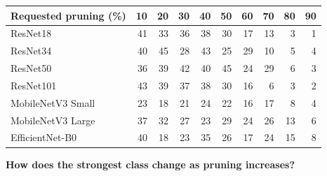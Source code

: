 \begin{center}\small\setlength{\tabcolsep}{4.2pt}
\begin{tabular}{@{}lrrrrrrrrr@{}}\toprule
Requested pruning (\%) & 10 & 20 & 30 & 40 & 50 & 60 & 70 & 80 & 90 \\ \midrule
ResNet18 & \cellcolor{teal!26}41 & \cellcolor{teal!21}33 & \cellcolor{teal!23}36 & \cellcolor{teal!24}38 & \cellcolor{teal!19}30 & \cellcolor{teal!11}17 & \cellcolor{teal!8}13 & \cellcolor{teal!1}3 & \cellcolor{teal!0}1 \\
ResNet34 & \cellcolor{teal!26}40 & \cellcolor{teal!29}45 & \cellcolor{teal!18}28 & \cellcolor{teal!27}43 & \cellcolor{teal!16}25 & \cellcolor{teal!18}29 & \cellcolor{teal!6}10 & \cellcolor{teal!3}5 & \cellcolor{teal!2}4 \\
ResNet50 & \cellcolor{teal!23}36 & \cellcolor{teal!25}39 & \cellcolor{teal!27}42 & \cellcolor{teal!26}40 & \cellcolor{teal!29}45 & \cellcolor{teal!15}24 & \cellcolor{teal!18}29 & \cellcolor{teal!3}6 & \cellcolor{teal!1}3 \\
ResNet101 & \cellcolor{teal!27}43 & \cellcolor{teal!25}39 & \cellcolor{teal!24}37 & \cellcolor{teal!24}38 & \cellcolor{teal!19}30 & \cellcolor{teal!10}16 & \cellcolor{teal!3}6 & \cellcolor{teal!1}3 & \cellcolor{teal!1}2 \\
MobileNetV3 Small & \cellcolor{teal!14}23 & \cellcolor{teal!11}18 & \cellcolor{teal!13}21 & \cellcolor{teal!15}24 & \cellcolor{teal!14}22 & \cellcolor{teal!10}16 & \cellcolor{teal!11}17 & \cellcolor{teal!5}8 & \cellcolor{teal!2}4 \\
MobileNetV3 Large & \cellcolor{teal!24}37 & \cellcolor{teal!20}32 & \cellcolor{teal!17}27 & \cellcolor{teal!14}23 & \cellcolor{teal!18}29 & \cellcolor{teal!15}24 & \cellcolor{teal!16}26 & \cellcolor{teal!8}13 & \cellcolor{teal!3}6 \\
EfficientNet-B0 & \cellcolor{teal!26}40 & \cellcolor{teal!11}18 & \cellcolor{teal!14}23 & \cellcolor{teal!22}35 & \cellcolor{teal!16}26 & \cellcolor{teal!11}17 & \cellcolor{teal!15}24 & \cellcolor{teal!9}15 & \cellcolor{teal!5}8 \\
\bottomrule\end{tabular}
\end{center}
\textbf{How does the strongest class change as pruning increases?}
